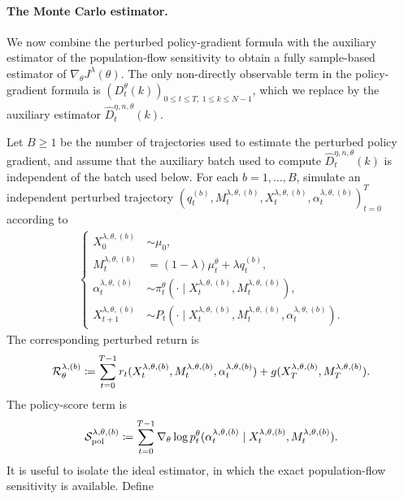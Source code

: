 \paragraph{The Monte Carlo estimator.}

We now combine the perturbed policy-gradient formula with the auxiliary estimator of the population-flow sensitivity to obtain a fully sample-based estimator of $\nabla_\theta J^\lambda (\theta)$. The only non-directly observable term in the policy-gradient formula is $\left(D_t^\theta(k) \right)_{0\leq t\leq T,\ 1\leq k\leq N-1}$, which we replace by the auxiliary estimator $\widehat D_t^{\eta,n,\theta}(k)$.

Let $B \geq 1$ be the number of trajectories used to estimate the perturbed policy gradient, and assume that the auxiliary batch used to compute $\widehat D_t^{\eta,n,\theta}(k)$ is independent of the batch used below. For each $b=1,\ldots,B$, simulate an independent perturbed trajectory $\left(q_t^{(b)}, M_t^{\lambda,\theta,(b)}, X_t^{\lambda,\theta,(b)},\alpha_t^{\lambda,\theta,(b)} \right)_{t=0}^T$ according to
\begin{align}
    \begin{cases}
        X_0^{\lambda,\theta,(b)} &\sim \mu_0,\\
        M_t^{\lambda,\theta,(b)} &=(1-\lambda)\mu_t^\theta + \lambda q_t^{(b)},\\
        \alpha_t^{\lambda,\theta,(b)} &\sim \pi_t^\theta(\cdot\mid X_t^{\lambda,\theta,(b)}, M_t^{\lambda,\theta,(b)}),\\
        X_{t+1}^{\lambda,\theta,(b)} &\sim P_t(\cdot\mid X_t^{\lambda,\theta,(b)}, M_t^{\lambda,\theta,(b)}, \alpha_t^{\lambda,\theta,(b)}).
    \end{cases}
\end{align}
The corresponding perturbed return is
\begin{align}
    {\cal R}_\theta^{\lambda,(b)} \coloneqq \sum_{t=0}^{T-1} r_t(X_t^{\lambda,\theta,(b)}, M_t^{\lambda,\theta,(b)},\alpha_t^{\lambda,\theta,(b)}) + g(X_T^{\lambda,\theta,(b)},M_T^{\lambda,\theta,(b)}).
\end{align}
The policy-score term is
\begin{align}
    {\cal S}_\mathrm{pol}^{\lambda,\theta,(b)} \coloneqq \sum_{t=0}^{T-1} \nabla_\theta \log p_t^\theta(\alpha_t^{\lambda,\theta,(b)} \mid X_t^{\lambda,\theta,(b)}, M_t^{\lambda,\theta,(b)}).
\end{align}
It is useful to isolate the ideal estimator, in which the exact population-flow sensitivity is available. Define
